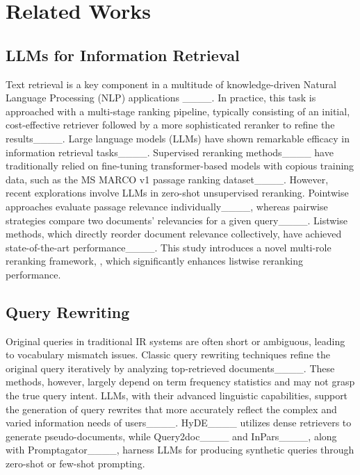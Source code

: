 \section{Related Works}
\subsection{LLMs for Information Retrieval}
Text retrieval is a key component in a multitude of knowledge-driven Natural Language Processing (NLP) applications ____. In practice, this task is approached with a multi-stage ranking pipeline, typically consisting of an initial, cost-effective retriever followed by a more sophisticated reranker to refine the results____. Large language models (LLMs) have shown remarkable efficacy in information retrieval tasks____. Supervised reranking methods____ have traditionally relied on fine-tuning transformer-based models with copious training data, such as the MS MARCO v1 passage ranking dataset____. However, recent explorations involve LLMs in zero-shot unsupervised reranking. Pointwise approaches evaluate passage relevance individually____, whereas pairwise strategies compare two documents' relevancies for a given query____. Listwise methods, which directly reorder document relevance collectively, have achieved state-of-the-art performance____. This study introduces a novel multi-role reranking framework, \ours, which significantly enhances listwise reranking performance.


\subsection{Query Rewriting}
Original queries in traditional IR systems are often short or ambiguous, leading to vocabulary mismatch issues. Classic query rewriting techniques refine the original query iteratively by analyzing top-retrieved documents____. These methods, however, largely depend on term frequency statistics and may not grasp the true query intent. LLMs, with their advanced linguistic capabilities, support the generation of query rewrites that more accurately reflect the complex and varied information needs of users____. HyDE____ utilizes dense retrievers to generate pseudo-documents, while Query2doc____ and InPars____, along with Promptagator____, harness LLMs for producing synthetic queries through zero-shot or few-shot prompting.


